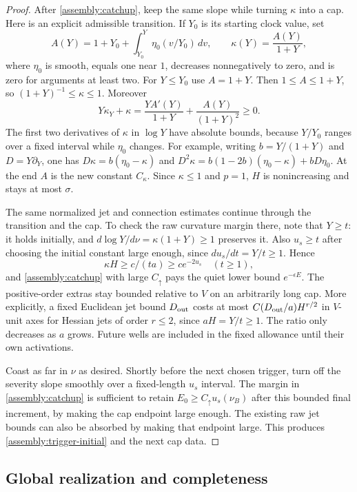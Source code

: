 \begin{proof}
After \eqref{assembly:catchup}, keep the same slope while
turning $\kappa$ into a cap. Here is an explicit admissible
transition. If $Y_0$ is its starting clock value, set
\[
 A(Y)=1+Y_0+\int_{Y_0}^Y \eta_0(v/Y_0)\,dv,\qquad
 \kappa(Y)=\frac{A(Y)}{1+Y},
\]
where $\eta_0$ is smooth, equals one near $1$, decreases
nonnegatively to zero, and is zero for arguments at least two.
For $Y\leq Y_0$ use $A=1+Y$.
Then $1\leq A\leq1+Y$, so
$(1+Y)^{-1}\leq\kappa\leq1$. Moreover
\[
 Y\kappa_Y+\kappa
 =\frac{YA'(Y)}{1+Y}+\frac{A(Y)}{(1+Y)^2}\geq0.
\]
The first two derivatives of $\kappa$ in $\log Y$ have absolute
bounds, because $Y/Y_0$ ranges over a fixed interval while
$\eta_0$ changes. For example, writing $b=Y/(1+Y)$ and
$D=Y\partial_Y$, one has
$D\kappa=b(\eta_0-\kappa)$ and
$D^2\kappa=b(1-2b)(\eta_0-\kappa)+bD\eta_0$.
At the end $A$ is the new constant $C_\kappa$.
Since $\kappa\leq1$ and $p=1$, $H$ is nonincreasing and
stays at most $\sigma$.

The same normalized jet and connection estimates continue
through the transition and the cap. To check the raw curvature
margin there, note that $Y\geq t$: it holds initially, and
$d\log Y/d\nu=\kappa(1+Y)\geq1$ preserves it.
Also $u_s\geq t$ after choosing the initial constant large
enough, since $du_s/dt=Y/t\geq1$.
Hence
\[
 \kappa H\geq c/(ta)\geq c e^{-2u_s}
 \quad(t\geq1),
\]
and \eqref{assembly:catchup} with large $C_\uparrow$ pays the
quiet lower bound $e^{-\epsilon E}$. The positive-order
extras stay bounded relative to $V$ on an arbitrarily long
cap. More explicitly, a fixed Euclidean jet bound $D_{\rm out}$
costs at most
$C(D_{\rm out}/a)H^{r/2}$ in $V$-unit axes for Hessian jets
of order $r\leq2$, since $aH=Y/t\geq1$.
The ratio only decreases as $a$ grows.
Future wells are included in the fixed allowance until
their own activations.

Coast as far in $\nu$ as desired. Shortly before the next
chosen trigger, turn off the severity slope smoothly over
a fixed-length $u_s$ interval. The margin in
\eqref{assembly:catchup} is sufficient to retain
$E_0\geq C_\uparrow u_s(\nu_B)$ after this bounded final
increment, by making the cap endpoint large enough.
The existing raw jet bounds can also be absorbed by making
that endpoint large. This produces
\eqref{assembly:trigger-initial} and the next cap data.
\end{proof}

\subsection{Global realization and completeness}

